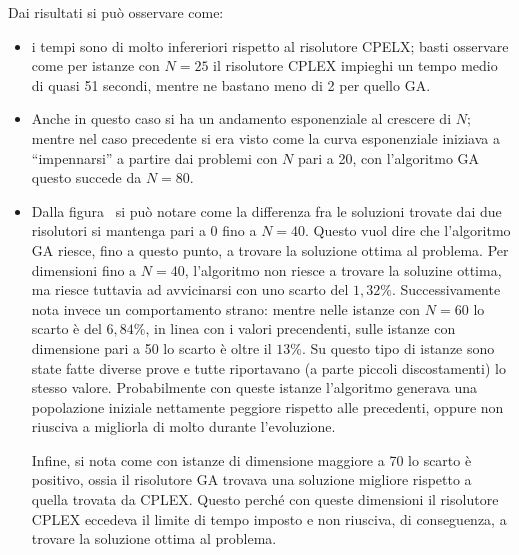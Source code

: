 Dai risultati si può osservare come:
\begin{itemize}
	\item i tempi sono di molto infereriori rispetto al risolutore CPELX;
	basti osservare come per istanze con $N=25$ il risolutore CPLEX impieghi un tempo medio di quasi 51 secondi,
	mentre ne bastano meno di 2 per quello GA.
	\item Anche in questo caso si ha un andamento esponenziale al crescere di $N$;
	mentre nel caso precedente si era visto come la curva esponenziale iniziava a ``impennarsi'' a partire dai
	problemi con $N$ pari a 20, con l'algoritmo GA questo succede da $N=80$.
	\item Dalla figura~\label{fig:gap-sol} si può notare come la differenza fra le soluzioni trovate dai due
	risolutori si mantenga pari a 0 fino a $N=40$. Questo vuol dire che l'algoritmo GA riesce, fino a questo punto,
	a trovare la soluzione ottima al problema.
	Per dimensioni fino a $N=40$, l'algoritmo non riesce a trovare la soluzine ottima, ma riesce tuttavia
	ad avvicinarsi con uno scarto del $1,32\%$.
	Successivamente nota invece un comportamento strano:
	mentre nelle istanze con $N=60$ lo scarto è del $6,84\%$, in linea con i valori precendenti,
	sulle istanze con dimensione pari a 50 lo scarto è oltre il $13\%$.
	Su questo tipo di istanze sono state fatte diverse prove e tutte riportavano (a parte piccoli discostamenti)
	lo stesso valore. Probabilmente con queste istanze l'algoritmo generava una popolazione iniziale
	nettamente peggiore rispetto alle precedenti, oppure non riusciva a migliorla di molto durante l'evoluzione.

	Infine, si nota come con istanze di dimensione maggiore a 70 lo scarto è positivo, ossia il risolutore
	GA trovava una soluzione migliore rispetto a quella trovata da CPLEX.
	Questo perché con queste dimensioni il risolutore CPLEX eccedeva il limite di tempo imposto e non riusciva,
	di conseguenza, a trovare la soluzione ottima al problema.
\end{itemize}
%
